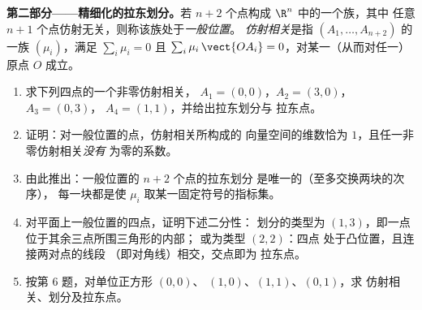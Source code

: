 \begin{problem}
\medskip
\noindent\textbf{第二部分——精细化的拉东划分。}若
$n + 2$ 个点构成 $\R^n$ 中的一个族，其中
任意 $n + 1$ 个点仿射无关，则称该族处于\emph{一般位置}。
\emph{仿射相关}是指 $(A_1, \dots, A_{n+2})$ 的
一族 $(\mu_i)$，满足 $\sum_i \mu_i = 0$ 且 $\sum_i
\mu_i\,\vect{OA_i} = 0$，对某一（从而对任一）原点 $O$ 成立。
\begin{enumerate}[resume]
  \item 求下列四点的一个非零仿射相关，
        $A_1 = (0,0)$，$A_2 = (3,0)$，$A_3 = (0,3)$，
        $A_4 = (1,1)$，并给出拉东划分与
        拉东点。
  \item 证明：对一般位置的点，仿射相关所构成的
        向量空间的维数恰为
        $1$，且任一非零仿射相关\emph{没有}
        为零的系数。
  \item 由此推出：一般位置的 $n + 2$ 个点的拉东划分
        是唯一的（至多交换两块的次序），
        每一块都是使
        $\mu_i$ 取某一固定符号的指标集。
  \item 对平面上一般位置的四点，证明下述二分性：
        划分的类型为
        $(1, 3)$，即一点位于其余三点所围三角形的内部；
        或为类型 $(2, 2)$：四点
        处于凸位置，且连接两对点的线段
        （即对角线）相交，交点即为
        拉东点。
  \item 按第 6 题，对单位正方形 $(0,0)$、
        $(1,0)$、$(1,1)$、$(0,1)$，求
        仿射相关、划分及拉东点。
\end{enumerate}


\end{problem}
